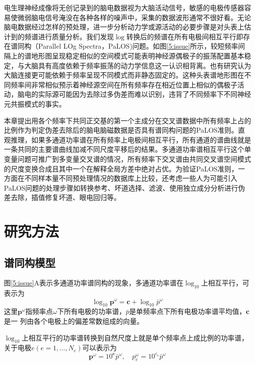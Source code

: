 电生理神经成像将无创记录到的脑电数据视为大脑活动信号，敏感的电极传感器容易使微弱脑电信号淹没在各种各样的噪声中，采集的数据波形通常不很好看。无论脑电数据经过怎样的预处理，进一步分析动力学或源活动的必要步骤是对头表上估计到的频谱进行质量分析。我们发现$\log$转换后的频谱在所有电极间相互平行即存在谱同构（Parallel LOg Spectra，PaLOS)问题。如图\ref{5:issue}所示，较短频率间隔上的谱地形图呈现稳定相似的空间模式可能表明神经源偶极子的振荡配置基本稳定，与大脑具有高度依赖于频率振荡的动力学信息这一认识相背离。也有研究认为大脑连接更可能依赖于频率呈现不同模式而非静态固定的。这种头表谱地形图在不同频率间非常相似预示着神经源空间在所有频率存在相近位置上相似的偶极子活动，脑电的实际源可能因为去除过多伪差而难以识别，违背了不同频率下不同神经元共振模式的事实。

本章提出用各个频率下共同正交基的第一个主成分在交叉谱数据中所有频率上占的比例作为判定伪差去除后的脑电脑磁数据是否具有谱同构问题的PaLOS准则。直观推理，如果多通道功率谱在所有频率上电极间相互平行，所有通道的谱曲线就是一条共同的主要谱曲线加减不同尺度平移后的结果。多通道功率谱相互平行这个单变量问题可推广到多变量交叉谱的情况，所有频率下交叉谱由共同交叉谱空间模式的尺度变换合成且其中一个在解释全局方差中绝对占优。为验证PaLOS准则，一方面在不同样本量不同预处理情况的数据库上比较，还考虑一些人为可能引入PaLOS问题的处理步骤如转换参考、坏道选择、滤波、使用独立成分分析进行伪差去除，插值修复坏道、眼电回归等。 

\section{研究方法}
\subsection{谱同构模型}
图\ref{5:issue}A表示多通道功率谱同构的现象，多通道功率谱在$\log_{10}$上相互平行，可表示为
\begin{equation}\label{eq5.1}
\log_{10}\mathbf{p}^\omega=\mathbf{c}+\log_{10}\bar{p}^\omega
\end{equation}
这里$\mathbf{p}^\omega$指频率点$\omega$下所有电极的功率谱，$\bar{p}$是单频率点下所有电极功率谱平均值，$\mathbf{c}$是一
列由各个电极上的偏差常数组成的向量。

$\log_{10}$上相互平行的功率谱转换到自然尺度上就是单个频率点上成比例的功率谱，关于电极$e(e=1,...,N_e)$可以表示为
\begin{equation}\label{eq5.2}
\mathbf{p}^\omega=10^\mathbf{c}\bar{p}^\omega,\quad{p}_e^\omega=10^{c_e}\bar{p}^\omega
\end{equation}

